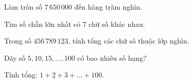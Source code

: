 \begin{ex} %
Làm tròn số $7\,650\,000$ đến hàng trăm nghìn.
\end{ex}

\begin{ex} %
Tìm số chẵn lớn nhất có 7 chữ số khác nhau.
\end{ex}

\begin{ex} %
Trong số $456\,789\,123$, tính tổng các chữ số thuộc lớp nghìn.
\end{ex}

\begin{ex} %
Dãy số $5, 10, 15, \dots, 100$ có bao nhiêu số hạng?
\end{ex}

\begin{ex} %
Tính tổng: $1 + 2 + 3 + \dots + 100$.
\end{ex}
